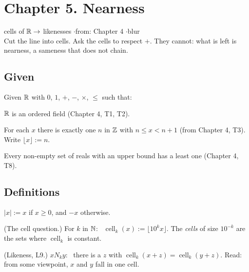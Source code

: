 \newpage

\section*{Chapter 5. Nearness}
\begin{center}
{\normalsize cells of $\mathbb{R} \to$ likenesses \quad$\cdot$\quad from: Chapter 4 \quad$\cdot$\quad blur}\\[4pt]
{\small Cut the line into cells. Ask the cells to respect $+$. They cannot: what is left is nearness, a sameness that does not chain.}
\end{center}

\subsection*{Given}

Given $\mathbb{R}$ with $0$, $1$, $+$, $-$, $\times$, $\le$ such that:
\begin{lines}
\item[\lab{G1}] $\mathbb{R}$ is an ordered field (Chapter 4, T1, T2).
\item[\lab{G2}] For each $x$ there is exactly one $n$ in $\mathbb{Z}$ with $n \le x < n + 1$ (from Chapter 4, T3). Write $\lfloor x \rfloor := n$.
\item[\lab{G3}] Every non-empty set of reals with an upper bound has a least one (Chapter 4, T8).
\end{lines}

\subsection*{Definitions}

\begin{lines}
\item[\lab{D1}] $|x| := x$ if $x \ge 0$, and $-x$ otherwise.
\item[\lab{D2}] (The cell question.) For $k$ in $\mathbb{N}$: \ $\operatorname{cell}_k(x) := \lfloor 10^k x \rfloor$. The \emph{cells} of size $10^{-k}$ are the sets where $\operatorname{cell}_k$ is constant.
\item[\lab{D3}] (Likeness, L9.) $x \mathrel{N_k} y$: \ there is a $z$ with $\operatorname{cell}_k(x + z) = \operatorname{cell}_k(y + z)$. Read: from some viewpoint, $x$ and $y$ fall in one cell.
\end{lines}

